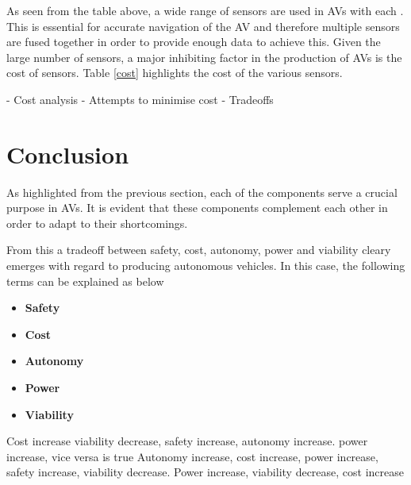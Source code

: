 As seen from the table above, a wide range of sensors are used in AVs with each . This is essential for accurate navigation of the AV and therefore multiple sensors are fused together in order to provide enough data to achieve this. Given the large number of sensors, a major inhibiting factor in the production of AVs is the cost of sensors. Table \ref{cost} highlights the cost of the various sensors.




- Cost analysis 
- Attempts to minimise cost 
- Tradeoffs 
\section{Conclusion}

As highlighted from the previous section, each of the components serve a crucial purpose in AVs. It is evident that these components complement each other in order to adapt to their shortcomings.

From this a tradeoff between safety, cost, autonomy, power and viability cleary emerges with regard to producing autonomous vehicles. 
In this case, the following terms can be explained as below

\begin{itemize}
    \item \textbf{Safety}
    \item \textbf{Cost}
    \item \textbf{Autonomy}
    \item \textbf{Power}
    \item \textbf{Viability}
\end{itemize}


Cost increase viability decrease, safety increase, autonomy increase. power increase, vice versa is true 
Autonomy increase, cost increase, power increase, safety increase, viability decrease.
Power increase, viability decrease, cost increase










